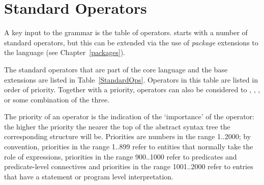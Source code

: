 
\section{Standard Operators}
\label{standardOperators}
A key input to the grammar is the table of operators. \Sr starts with a number of standard operators, but this can be extended via the use of \emph{package} extensions to the language (see Chapter~\vref{packages}).

The standard operators that are part of the core language and the base extensions are listed in Table~\vref{StandardOps}. Operators in this table are listed in order of priority. Together with a priority, operators can also be considered to , , , or some combination of the three.

The priority of an operator is the indication of the `importance' of the operator: the higher the priority the nearer the top of the abstract syntax tree the corresponding structure will be. Priorities are numbers in the range 1..2000; by convention, priorities in the range 1..899 refer to entities that normally take the role of expressions, priorities in the range 900..1000 refer to predicates and predicate-level connectives and priorities in the range 1001..2000 refer to entries that have a statement or program level interpretation. 


